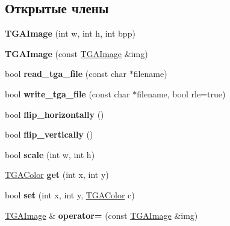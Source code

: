 \subsection*{Открытые члены}
\begin{DoxyCompactItemize}
\item 
\mbox{\label{classTGAImage_a71c89ee2f760f68af17e79d9839f2670}} 
{\bfseries T\+G\+A\+Image} (int w, int h, int bpp)
\item 
\mbox{\label{classTGAImage_ace9b4199c62051cb5735288c0a74d866}} 
{\bfseries T\+G\+A\+Image} (const \hyperlink{classTGAImage}{T\+G\+A\+Image} \&img)
\item 
\mbox{\label{classTGAImage_a4ebada0ee5a84be6296966a8db5ec556}} 
bool {\bfseries read\+\_\+tga\+\_\+file} (const char $\ast$filename)
\item 
\mbox{\label{classTGAImage_a8659d0255565e0fb2180a78c5830c85c}} 
bool {\bfseries write\+\_\+tga\+\_\+file} (const char $\ast$filename, bool rle=true)
\item 
\mbox{\label{classTGAImage_a44ea3b7c3cbae84ec9d6ea47c52889fe}} 
bool {\bfseries flip\+\_\+horizontally} ()
\item 
\mbox{\label{classTGAImage_a0634a35dcfe7c378c1bf9f1797573180}} 
bool {\bfseries flip\+\_\+vertically} ()
\item 
\mbox{\label{classTGAImage_a578165f9de10f95d882cd490b4f3634f}} 
bool {\bfseries scale} (int w, int h)
\item 
\mbox{\label{classTGAImage_a42b47f4e9e8fbaf577fd9e826d00e011}} 
\hyperlink{structTGAColor}{T\+G\+A\+Color} {\bfseries get} (int x, int y)
\item 
\mbox{\label{classTGAImage_a34d702eee32a232e4c07fca0b35a2a48}} 
bool {\bfseries set} (int x, int y, \hyperlink{structTGAColor}{T\+G\+A\+Color} c)
\item 
\mbox{\label{classTGAImage_ad8e1f89de9fe4908f9a326f9a579c0b1}} 
\hyperlink{classTGAImage}{T\+G\+A\+Image} \& {\bfseries operator=} (const \hyperlink{classTGAImage}{T\+G\+A\+Image} \&img)

\end{DoxyCompactItemize}
